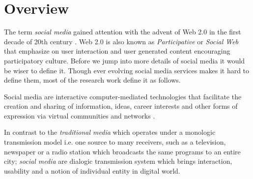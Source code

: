 \section*{Overview}
\label{sec:overview}
The term {\em social media} gained attention with the advent of Web 2.0 in the first decade of 20th century \cite{kaplan2010users}. Web 2.0 is also known as {\em Participative} or {\em Social Web} that emphasize on user interaction and user generated content encouraging participatory culture. Before we jump into more details of social media it would be wiser to define it. Though ever evolving social media services makes it hard to define them, most of the research work define it as follows.

\begin{definition}
Social media are interactive computer-mediated technologies that facilitate the creation and sharing of information, ideas, career interests and other forms of expression via virtual communities and networks \cite{kietzmann2011social}.
\end{definition}

In contrast to the {\em traditional media} which operates under a monologic transmission model i.e. one source to many receivers, such as a television, newspaper  or a radio station which broadcasts the same programs to an entire city; {\em social media} are dialogic transmission system which brings interaction, usability and a notion of individual entity in digital world.




